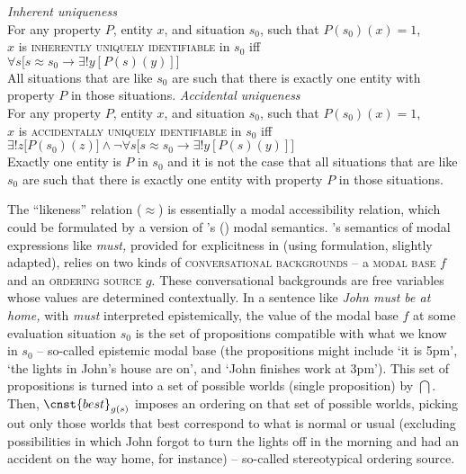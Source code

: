 \documentclass[output=paper,colorlinks,citecolor=brown,newtxmath]{langscibook}
\begin{document}
\ea \textit{Inherent uniqueness}\label{simik:def:inh-uniq}\\
For any property $P$, entity $x$, and situation $s_0$, such that $P(s_0)(x)=1$,\\
$x$ is \textsc{inherently uniquely identifiable} in $s_0$ iff\\
$\forall s\big[s\approx s_0\rightarrow\exists!y[P(s)(y)]\big]$\\
All situations that are like $s_0$ are such that there is exactly one entity with property $P$ in those situations.
\ex \textit{Accidental uniqueness}\label{simik:def:acc-uniq}\\
For any property $P$, entity $x$, and situation $s_0$, such that $P(s_0)(x)=1$,\\
$x$ is \textsc{accidentally uniquely identifiable} in $s_0$ iff\\
$\exists!z\big[P(s_0)(z)\big]\wedge\neg\forall s\big[s\approx s_0\rightarrow\exists!y[P(s)(y)]\big]$\\
Exactly one entity is $P$ in $s_0$ and it is not the case that all situations that are like $s_0$ are such that there is exactly one entity with property $P$ in those situations.
\z

\noindent The ``likeness'' relation ($\approx$) is essentially a modal accessibility relation, which could be formulated by a version of \citeauthor{Kratzer1981}'s (\citeyear{Kratzer1981,Kratzer1991,Kratzer2012}) modal semantics. \citeauthor{Kratzer1981}'s semantics of modal expressions like \textit{must,} provided for explicitness in  (using  formulation, slightly adapted), relies on two kinds of \textsc{conversational backgrounds} -- a \textsc{modal base} $f$ and an \textsc{ordering source} $g$. These conversational backgrounds are free variables whose values are determined contextually. In a sentence like \textit{John must be at home,} with \textit{must} interpreted epistemically, the value of the modal base $f$ at some evaluation situation $s_0$ is the set of propositions compatible with what we know in $s_0$ -- so-called epistemic modal base (the propositions might include `it is 5pm', `the lights in John's house are on', and `John finishes work at 3pm'). This set of propositions is turned into a set of possible worlds (single proposition) by $\bigcap$. Then, $\cnst{best}_{g(s)}$ imposes an ordering on that set of possible worlds, picking out only those worlds that best correspond to what is normal or usual (excluding possibilities in which John forgot to turn the lights off in the morning and had an accident on the way home, for instance) -- so-called stereotypical ordering source.
\end{document}
